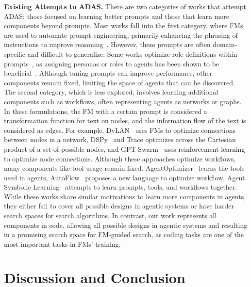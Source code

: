 \documentclass{article}
\newcommand{\problem}{ADAS\xspace}
\begin{document}
\noindent\textbf{Existing Attempts to \problem.}\hspace{0.5em} There are two categories of works that attempt \problem: those focused on learning better prompts and those that learn more components beyond prompts. Most works fall into the first category, where FMs are used to automate prompt engineering, primarily enhancing the phrasing of instructions to improve reasoning~\citep{yang2024OPRO,fernando2024promptbreeder,zhou2024self,yuksekgonul2024textgrad}. However, these prompts are often domain-specific and difficult to generalize. Some works optimize role definitions within prompts~\citep{yuan2024evoagent,chen2023agentverse,chen2023auto,wu2023autogen}, as assigning personas or roles to agents has been shown to be beneficial~\citep{xu2023expertprompting}. Although tuning prompts can improve performance, other components remain fixed, limiting the space of agents that can be discovered. The second category, which is less explored, involves learning additional components such as workflows, often representing agents as networks or graphs. In these formulations, the FM with a certain prompt is considered a transformation function for text on nodes, and the information flow of the text is considered as edges. For example, DyLAN~\citep{liu2023dynamic} uses FMs to optimize connections between nodes in a network, DSPy~\citep{khattab2024dspy} and Trace \citep{cheng2025trace} optimizes across the Cartesian product of a set of possible nodes, and GPT-Swarm~\citep{zhugegptswarm} uses reinforcement learning to optimize node connections. Although these approaches optimize workflows, many components like tool usage remain fixed. AgentOptimizer~\citep{zhang2024agentoptimizer} learns the tools used in agents, AutoFlow~\citep{li2024autoflow} proposes a new language to optimize workflow, Agent Symbolic Learning~\citep{zhou2024symbolic} attempts to learn prompts, tools, and workflows together. While these works share similar motivations to learn more components in agents, they either fail to cover all possible designs in agentic systems or have harder search spaces for search algorithms. In contrast, our work represents all components in code, allowing all possible designs in agentic systems and resulting in a promising search space for FM-guided search, as coding tasks are one of the most important tasks in FMs' training.

\section{Discussion and Conclusion}
\label{section:future_work}
\end{document}
